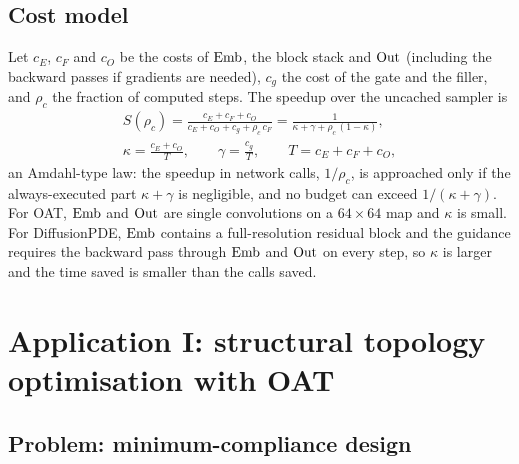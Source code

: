 \subsection{Cost model}\label{sec:app-cost}
Let $c_E$, $c_F$ and $c_O$ be the costs of $\mathrm{Emb}$, the block stack and $\mathrm{Out}$ (including the backward passes if gradients are needed), $c_g$ the cost of the gate and the filler, and $\rho_c$ the fraction of computed steps. The speedup over the uncached sampler is
\begin{equation}\label{eq:app-amdahl}
  \begin{gathered}
  S(\rho_c) = \frac{c_E+c_F+c_O}{c_E+c_O+c_g+\rho_c\,c_F} = \frac{1}{\kappa+\gamma+\rho_c\,(1-\kappa)},\\
  \kappa = \frac{c_E+c_O}{T},\qquad \gamma = \frac{c_g}{T},\qquad T = c_E+c_F+c_O ,
  \end{gathered}
\end{equation}
an Amdahl-type law: the speedup in network calls, $1/\rho_c$, is approached only if the always-executed part $\kappa+\gamma$ is negligible, and no budget can exceed $1/(\kappa+\gamma)$. For OAT, $\mathrm{Emb}$ and $\mathrm{Out}$ are single convolutions on a $64\times64$ map and $\kappa$ is small. For DiffusionPDE, $\mathrm{Emb}$ contains a full-resolution residual block and the guidance requires the backward pass through $\mathrm{Emb}$ and $\mathrm{Out}$ on every step, so $\kappa$ is larger and the time saved is smaller than the calls saved.

\section{Application I: structural topology optimisation with OAT}\label{sec:app-oat}

\subsection{Problem: minimum-compliance design}
